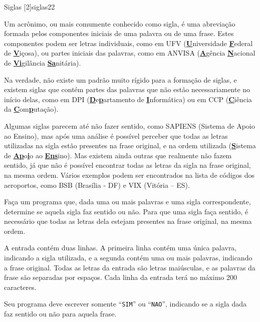 \documentclass[12pt,a4paper,oneside]{article}
\begin{document}
\begin{problem}{Siglas [2]}{siglas2}{2}
 
Um acrônimo, ou mais comumente conhecido como sigla, é uma abreviação formada pelos componentes iniciais de uma palavra ou de uma frase. Estes componentes podem ser letras individuais, como em UFV (\underline{\textbf{U}}niversidade \underline{\textbf{F}}ederal
de \underline{\textbf{V}}içosa), ou partes iniciais das palavras, como em ANVISA (\underline{\textbf{A}}gência \underline{\textbf{N}}acional de \underline{\textbf{Vi}}gilância \underline{\textbf{Sa}}nitária).

Na verdade, não existe um padrão muito rígido para a formação de siglas, e existem siglas que contém partes das palavras que não estão necessariamente no início delas, como em DPI (\underline{\textbf{D}}e\underline{\textbf{p}}artamento de \underline{\textbf{I}}nformática) ou em CCP (\underline{\textbf{C}}iência da \underline{\textbf{C}}om\underline{\textbf{p}}utação).

Algumas siglas parecem até não fazer sentido, como SAPIENS (Sistema de Apoio
ao Ensino), mas após uma análise é possível perceber que todas as letras
utilizadas na sigla estão presentes na frase original, e na ordem utilizada (\underline{\textbf{S}}istema
de \underline{\textbf{Ap}}o\underline{\textbf{i}}o ao \underline{\textbf{Ens}}ino). Mas existem ainda outras que realmente não fazem sentido, já que não é possível encontrar todas as letras da sigla na frase original, na
mesma ordem. Vários exemplos podem ser encontrados na lista de códigos dos
aeroportos, como BSB (Brasília - DF) e VIX (Vitória – ES).

Faça um programa que, dada uma ou mais palavras e uma sigla correspondente,
determine se aquela sigla faz sentido ou não. Para que uma sigla faça sentido, é
necessário que todas as letras dela estejam presentes na frase original, na
mesma ordem.

%

\InputFile

A entrada contém duas linhas. A primeira linha contém uma única palavra, indicando a sigla utilizada, e a segunda contém uma ou mais palavras, indicando a frase original. Todas as letras da entrada são letras maiúsculas, e as palavras da frase são separadas por espaços. Cada linha da entrada terá no máximo 200
caracteres.

\OutputFile

Seu programa deve escrever somente ``\texttt{SIM}'' ou ``\texttt{NAO}'', indicando se a sigla dada faz sentido ou não para aquela frase.


\end{problem}
\end{document}
